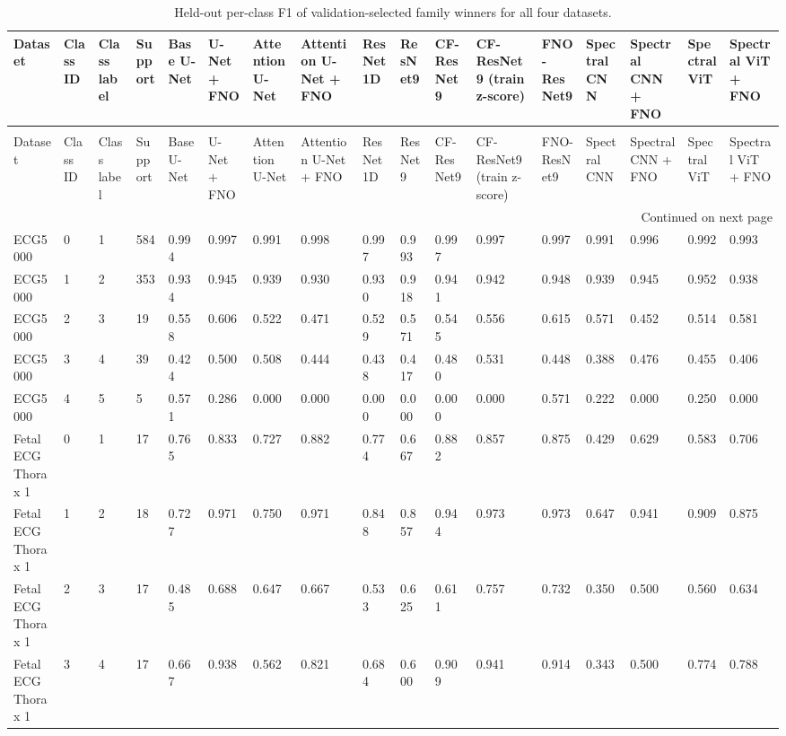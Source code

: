 \begin{longtable}{lllllllllllllllll}
\caption{Held-out per-class F1 of validation-selected family winners for all four datasets.} \label{tab:per_class_f1_all_datasets} \\
\toprule
Dataset & Class ID & Class label & Support & Base U-Net & U-Net + FNO & Attention U-Net & Attention U-Net + FNO & ResNet1D & ResNet9 & CF-ResNet9 & CF-ResNet9 (train z-score) & FNO-ResNet9 & Spectral CNN & Spectral CNN + FNO & Spectral ViT & Spectral ViT + FNO \\
\midrule
\endfirsthead
\caption[]{Held-out per-class F1 of validation-selected family winners for all four datasets.} \\
\toprule
Dataset & Class ID & Class label & Support & Base U-Net & U-Net + FNO & Attention U-Net & Attention U-Net + FNO & ResNet1D & ResNet9 & CF-ResNet9 & CF-ResNet9 (train z-score) & FNO-ResNet9 & Spectral CNN & Spectral CNN + FNO & Spectral ViT & Spectral ViT + FNO \\
\midrule
\endhead
\midrule
\multicolumn{17}{r}{Continued on next page} \\
\midrule
\endfoot
\bottomrule
\endlastfoot
ECG5000 & 0 & 1 & 584 & 0.994 & 0.997 & 0.991 & 0.998 & 0.997 & 0.993 & 0.997 & 0.997 & 0.997 & 0.991 & 0.996 & 0.992 & 0.993 \\
ECG5000 & 1 & 2 & 353 & 0.934 & 0.945 & 0.939 & 0.930 & 0.930 & 0.918 & 0.941 & 0.942 & 0.948 & 0.939 & 0.945 & 0.952 & 0.938 \\
ECG5000 & 2 & 3 & 19 & 0.558 & 0.606 & 0.522 & 0.471 & 0.529 & 0.571 & 0.545 & 0.556 & 0.615 & 0.571 & 0.452 & 0.514 & 0.581 \\
ECG5000 & 3 & 4 & 39 & 0.424 & 0.500 & 0.508 & 0.444 & 0.438 & 0.417 & 0.480 & 0.531 & 0.448 & 0.388 & 0.476 & 0.455 & 0.406 \\
ECG5000 & 4 & 5 & 5 & 0.571 & 0.286 & 0.000 & 0.000 & 0.000 & 0.000 & 0.000 & 0.000 & 0.571 & 0.222 & 0.000 & 0.250 & 0.000 \\
Fetal ECG Thorax 1 & 0 & 1 & 17 & 0.765 & 0.833 & 0.727 & 0.882 & 0.774 & 0.667 & 0.882 & 0.857 & 0.875 & 0.429 & 0.629 & 0.583 & 0.706 \\
Fetal ECG Thorax 1 & 1 & 2 & 18 & 0.727 & 0.971 & 0.750 & 0.971 & 0.848 & 0.857 & 0.944 & 0.973 & 0.973 & 0.647 & 0.941 & 0.909 & 0.875 \\
Fetal ECG Thorax 1 & 2 & 3 & 17 & 0.485 & 0.688 & 0.647 & 0.667 & 0.533 & 0.625 & 0.611 & 0.757 & 0.732 & 0.350 & 0.500 & 0.560 & 0.634 \\
Fetal ECG Thorax 1 & 3 & 4 & 17 & 0.667 & 0.938 & 0.562 & 0.821 & 0.684 & 0.600 & 0.909 & 0.941 & 0.914 & 0.343 & 0.500 & 0.774 & 0.788 \\

\end{longtable}
